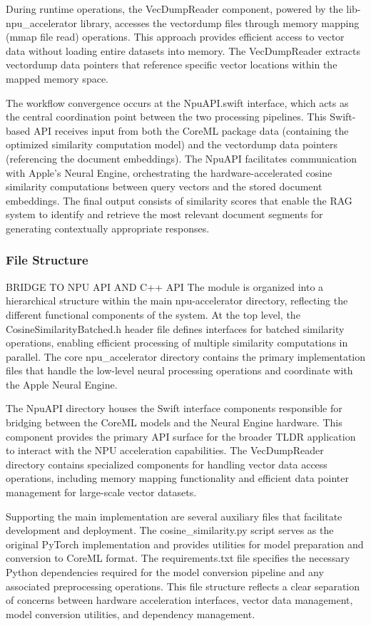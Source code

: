 During runtime operations, the VecDumpReader component, powered by the lib-npu\_accelerator library, accesses the vectordump files through memory mapping (mmap file read) operations. This approach provides efficient access to vector data without loading entire datasets into memory. The VecDumpReader extracts vectordump data pointers that reference specific vector locations within the mapped memory space.

The workflow convergence occurs at the NpuAPI.swift interface, which acts as the central coordination point between the two processing pipelines. This Swift-based API receives input from both the CoreML package data (containing the optimized similarity computation model) and the vectordump data pointers (referencing the document embeddings). The NpuAPI facilitates communication with Apple's Neural Engine, orchestrating the hardware-accelerated cosine similarity computations between query vectors and the stored document embeddings. The final output consists of similarity scores that enable the RAG system to identify and retrieve the most relevant document segments for generating contextually appropriate responses.

\subsubsection{File Structure}
BRIDGE TO NPU API AND C++ API
The module is organized into a hierarchical structure within the main npu-accelerator directory, reflecting the different functional components of the system. At the top level, the CosineSimilarityBatched.h header file defines interfaces for batched similarity operations, enabling efficient processing of multiple similarity computations in parallel. The core npu\_accelerator directory contains the primary implementation files that handle the low-level neural processing operations and coordinate with the Apple Neural Engine.

The NpuAPI directory houses the Swift interface components responsible for bridging between the CoreML models and the Neural Engine hardware. This component provides the primary API surface for the broader TLDR application to interact with the NPU acceleration capabilities. The VecDumpReader directory contains specialized components for handling vector data access operations, including memory mapping functionality and efficient data pointer management for large-scale vector datasets.

Supporting the main implementation are several auxiliary files that facilitate development and deployment. The cosine\_similarity.py script serves as the original PyTorch implementation and provides utilities for model preparation and conversion to CoreML format. The requirements.txt file specifies the necessary Python dependencies required for the model conversion pipeline and any associated preprocessing operations. This file structure reflects a clear separation of concerns between hardware acceleration interfaces, vector data management, model conversion utilities, and dependency management.
